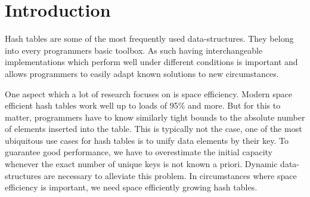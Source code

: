 \documentclass[a4paper,UKenglish]{lipics-v2016}
\begin{document}

\section{Introduction}
Hash tables are some of the most frequently used data-structures. They
belong into every programmers basic toolbox.  As such having
interchangeable implementations which perform well under different
conditions is important and allows programmers to easily adapt known
solutions to new circumstances.

One aspect which a lot of research focuses on is space efficiency.
Modern space efficient hash tables work well up to loads of 95\% and
more. But for this to matter, programmers have to know similarly tight
bounds to the absolute number of elements inserted into the table.
This is typically not the case, one of the most ubiquitous use cases
for hash tables is to unify data elements by their key.  To guarantee
good performance, we have to overestimate the initial capacity
whenever the exact number of unique keys is not known a priori.
Dynamic data-structures are necessary to alleviate this problem.  In
circumstances where space efficiency is important, we need space
efficiently growing hash tables.
\end{document}
